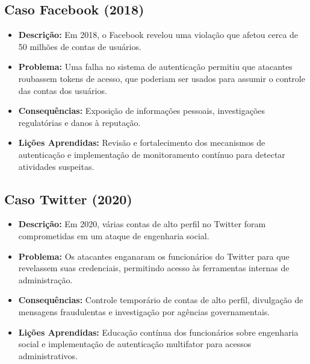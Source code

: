 \documentclass{scrartcl}
\begin{document}
\subsection{Caso Facebook (2018)}
\label{sec:orga571a87}
\begin{itemize}
\item \textbf{\textbf{Descrição:}} Em 2018, o Facebook revelou uma violação que afetou cerca de 50
milhões de contas de usuários.
\item \textbf{\textbf{Problema:}} Uma falha no sistema de autenticação permitiu que atacantes
roubassem tokens de acesso, que poderiam ser usados para assumir o controle
das contas dos usuários.
\item \textbf{\textbf{Consequências:}} Exposição de informações pessoais, investigações
regulatórias e danos à reputação.
\item \textbf{\textbf{Lições Aprendidas:}} Revisão e fortalecimento dos mecanismos de autenticação
e implementação de monitoramento contínuo para detectar atividades suspeitas.
\end{itemize}

\subsection{Caso Twitter (2020)}
\label{sec:orgf01d17e}
\begin{itemize}
\item \textbf{\textbf{Descrição:}} Em 2020, várias contas de alto perfil no Twitter foram
comprometidas em um ataque de engenharia social.
\item \textbf{\textbf{Problema:}} Os atacantes enganaram os funcionários do Twitter para que
revelassem suas credenciais, permitindo acesso às ferramentas internas de
administração.
\item \textbf{\textbf{Consequências:}} Controle temporário de contas de alto perfil, divulgação de
mensagens fraudulentas e investigação por agências governamentais.
\item \textbf{\textbf{Lições Aprendidas:}} Educação contínua dos funcionários sobre engenharia
social e implementação de autenticação multifator para acessos
administrativos.
\end{itemize}
\end{document}
